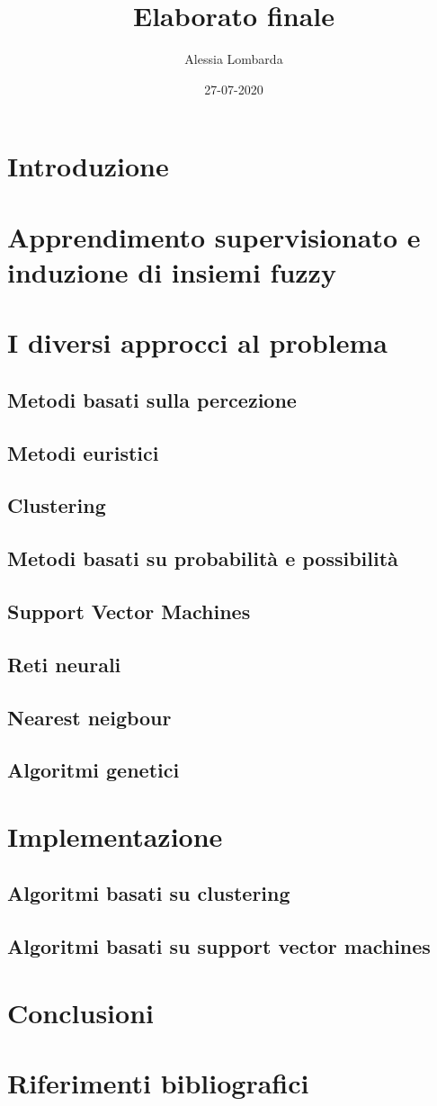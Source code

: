 \documentclass{article}
\title{Elaborato finale}
\date{27-07-2020}
\author{Alessia Lombarda}
\begin{document}
	\maketitle
	\tableofcontents
	\newpage
	\section{Introduzione}
	\section{Apprendimento supervisionato e induzione di insiemi fuzzy}
	\section{I diversi approcci al problema}
	\subsection{Metodi basati sulla percezione}
	\subsection{Metodi euristici}
	\subsection{Clustering}
	\subsection{Metodi basati su probabilità e possibilità}
	\subsection{Support Vector Machines}
	\subsection{Reti neurali}
	\subsection{Nearest neigbour}	
	\subsection{Algoritmi genetici}
	\section{Implementazione}
	\subsection{Algoritmi basati su clustering}
	\subsection{Algoritmi basati su support vector machines}
	\section{Conclusioni}
	\section{Riferimenti bibliografici}
	
\end{document}
